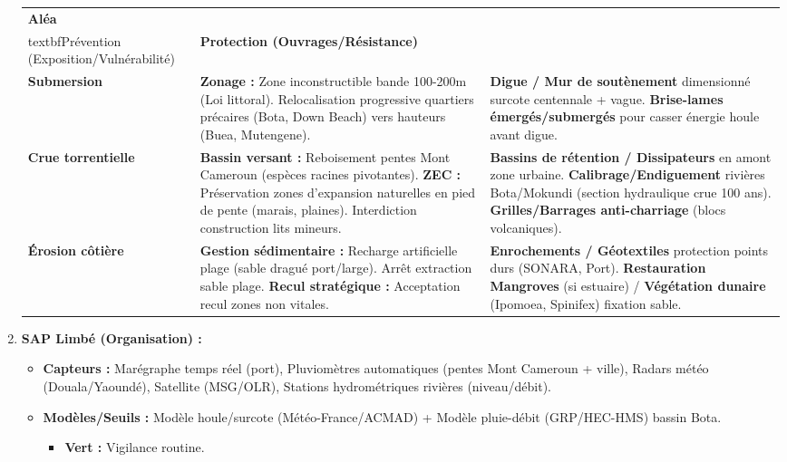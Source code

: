 \documentclass[11pt]{article}
\begin{document}
\begin{exoresolu}
\begin{enumerate}
\begin{center}
              \begin{tabularx}{\linewidth}{|l|X|X|}\hline
                  \rowcolor{popblueL} \textbf{Aléa} & \\textbf{Prévention (Exposition/Vulnérabilité)} & \textbf{Protection (Ouvrages/Résistance)} \\ \hline
                  \textbf{Submersion} & \textbf{Zonage :} Zone inconstructible bande 100-200m (Loi littoral). Relocalisation progressive quartiers précaires (Bota, Down Beach) vers hauteurs (Buea, Mutengene). & \textbf{Digue / Mur de soutènement} dimensionné surcote centennale + vague. \textbf{Brise-lames émergés/submergés} pour casser énergie houle avant digue. \\ \hline
                  \textbf{Crue torrentielle} & \textbf{Bassin versant :} Reboisement pentes Mont Cameroun (espèces racines pivotantes). \textbf{ZEC :} Préservation zones d'expansion naturelles en pied de pente (marais, plaines). Interdiction construction lits mineurs. & \textbf{Bassins de rétention / Dissipateurs} en amont zone urbaine. \textbf{Calibrage/Endiguement} rivières Bota/Mokundi (section hydraulique crue 100 ans). \textbf{Grilles/Barrages anti-charriage} (blocs volcaniques). \\ \hline
                  \textbf{Érosion côtière} & \textbf{Gestion sédimentaire :} Recharge artificielle plage (sable dragué port/large). Arrêt extraction sable plage. \textbf{Recul stratégique :} Acceptation recul zones non vitales. & \textbf{Enrochements / Géotextiles} protection points durs (SONARA, Port). \textbf{Restauration Mangroves} (si estuaire) / \textbf{Végétation dunaire} (Ipomoea, Spinifex) fixation sable. \\ \hline
              \end{tabularx}
          \end{center}
    \item \textbf{SAP Limbé (Organisation) :}
          \begin{itemize}
              \item \textbf{Capteurs :} Marégraphe temps réel (port), Pluviomètres automatiques (pentes Mont Cameroun + ville), Radars météo (Douala/Yaoundé), Satellite (MSG/OLR), Stations hydrométriques rivières (niveau/débit).
              \item \textbf{Modèles/Seuils :} Modèle houle/surcote (Météo-France/ACMAD) + Modèle pluie-débit (GRP/HEC-HMS) bassin Bota.
                  \begin{itemize}
                      \item \textbf{Vert :} Vigilance routine.

\end{itemize}
\end{itemize}
\end{enumerate}
\end{exoresolu}
\end{document}
